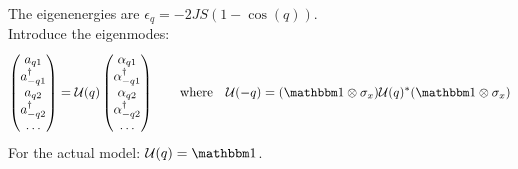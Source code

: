 \documentclass{article}
\begin{document}
The eigenenergies are $\epsilon_q = -2JS(1 - \cos(q))$. \\
Introduce the eigenmodes:
\begin{align}
	\begin{pmatrix}
		a_{q1} \\ a_{-q1}^\dagger \\ a_{q2} \\ a_{-q2}^\dagger \\ \dots
	\end{pmatrix} = \mathcal U(q) \begin{pmatrix}
		\alpha_{q1} \\ \alpha_{-q1}^\dagger \\ \alpha_{q2} \\ \alpha_{-q2}^\dagger \\ \dots
	\end{pmatrix} \qquad \text{where} \quad \mathcal U(-q) = (\mathbbm 1 \otimes \sigma_x) \mathcal U(q)^* (\mathbbm 1 \otimes \sigma_x)
\end{align}
For the actual model: $\mathcal U(q) = \mathbbm 1$.
\end{document}
